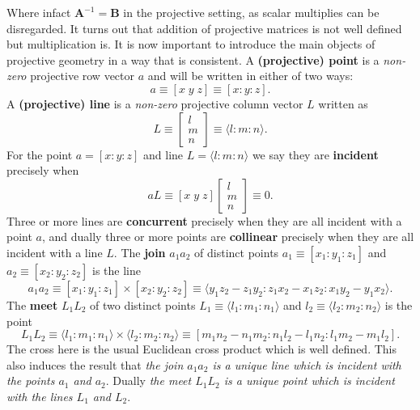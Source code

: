 \documentclass{unswthesis}
\begin{document}
Where infact $\mathbf{A}^{-1}=\mathbf{B}$ in the projective setting, as
scalar multiplies can be disregarded. It turns out that addition of
projective matrices is not well defined but multiplication is.\newline
It is now important to introduce the main objects of projective geometry in
a way that is consistent. A \textbf{(projective) point} is a \textit{non-zero%
} projective row vector $a$ and will be written in either of two ways: 
\begin{equation*}
a\equiv[x\;y\;z]\equiv[x:y:z]. 
\end{equation*}
A \textbf{(projective) line} is a \textit{non-zero} projective column vector 
$L$ written as 
\begin{equation*}
L\equiv%
\begin{bmatrix}
l \\ 
m \\ 
n%
\end{bmatrix}%
\equiv\langle l:m:n\rangle. 
\end{equation*}
For the point $a=[x:y:z]$ and line $L=\langle l:m:n\rangle$ we say they are 
\textbf{incident} precisely when 
\begin{equation}
aL\equiv[x\;y\;z]%
\begin{bmatrix}
l \\ 
m \\ 
n%
\end{bmatrix}%
\equiv0.
\end{equation}
Three or more lines are \textbf{concurrent} precisely when they are all
incident with a point $a$, and dually three or more points are \textbf{%
collinear} precisely when they are all incident with a line $L$.\newline
The \textbf{join} $a_{1}a_{2}$ of distinct points $a_{1}\equiv[%
x_{1}:y_{1}:z_{1}]$ and $a_{2}\equiv[x_{2}:y_{2}:z_{2}]$ is the line 
\begin{equation*}
a_{1}a_{2}\equiv[x_{1}:y_{1}:z_{1}]\times[x_{2}:y_{2}:z_{2}]\equiv\langle
y_{1}z_{2}-z_{1}y_{2}:z_{1}x_{2}-x_{1}z_{2}:x_{1}y_{2}-y_{1}x_{2}\rangle. 
\end{equation*}
The \textbf{meet} $L_{1}L_{2}$ of two distinct points $L_{1}\equiv\langle
l_{1}:m_{1}:n_{1}\rangle$ and $l_{2}\equiv\langle l_{2}:m_{2}:n_{2}\rangle$
is the point 
\begin{equation*}
L_{1}L_{2}\equiv\langle l_{1}:m_{1}:n_{1}\rangle\times\langle
l_{2}:m_{2}:n_{2}\rangle\equiv[%
m_{1}n_{2}-n_{1}m_{2}:n_{1}l_{2}-l_{1}n_{2}:l_{1}m_{2}-m_{1}l_{2}]. 
\end{equation*}
The cross here is the usual Euclidean cross product which is well defined.
This also induces the result that \textit{the join $a_{1}a_{2}$ is a unique
line which is incident with the points $a_{1}$ and $a_{2}$}. Dually \textit{%
the meet $L_{1}L_{2}$ is a unique point which is incident with the lines $%
L_{1}$ and $L_{2}$}.
\end{document}
